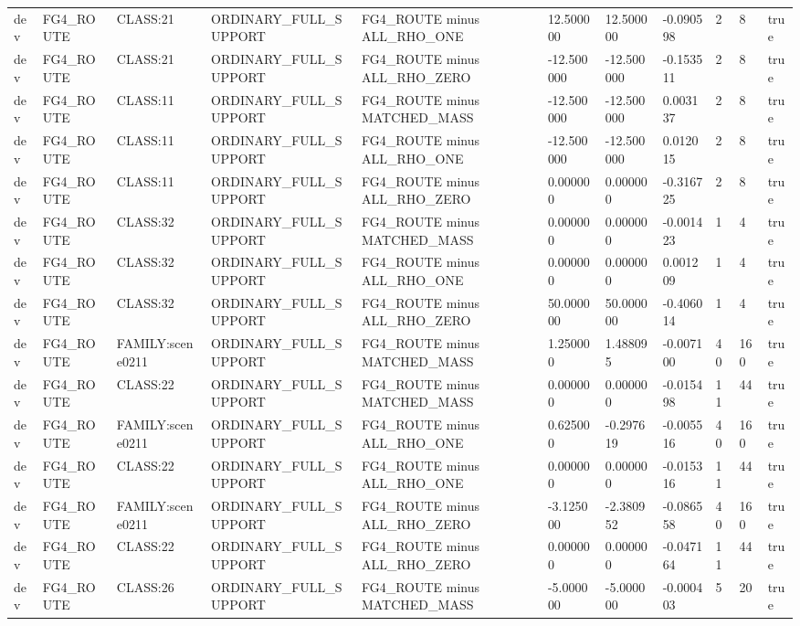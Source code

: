 \begin{tabular}{lllllllllll}
dev & FG4\_ROUTE & CLASS:21 & ORDINARY\_FULL\_SUPPORT & FG4\_ROUTE minus ALL\_RHO\_ONE & 12.500000 & 12.500000 & -0.090598 & 2 & 8 & true \\
dev & FG4\_ROUTE & CLASS:21 & ORDINARY\_FULL\_SUPPORT & FG4\_ROUTE minus ALL\_RHO\_ZERO & -12.500000 & -12.500000 & -0.153511 & 2 & 8 & true \\
dev & FG4\_ROUTE & CLASS:11 & ORDINARY\_FULL\_SUPPORT & FG4\_ROUTE minus MATCHED\_MASS & -12.500000 & -12.500000 & 0.003137 & 2 & 8 & true \\
dev & FG4\_ROUTE & CLASS:11 & ORDINARY\_FULL\_SUPPORT & FG4\_ROUTE minus ALL\_RHO\_ONE & -12.500000 & -12.500000 & 0.012015 & 2 & 8 & true \\
dev & FG4\_ROUTE & CLASS:11 & ORDINARY\_FULL\_SUPPORT & FG4\_ROUTE minus ALL\_RHO\_ZERO & 0.000000 & 0.000000 & -0.316725 & 2 & 8 & true \\
dev & FG4\_ROUTE & CLASS:32 & ORDINARY\_FULL\_SUPPORT & FG4\_ROUTE minus MATCHED\_MASS & 0.000000 & 0.000000 & -0.001423 & 1 & 4 & true \\
dev & FG4\_ROUTE & CLASS:32 & ORDINARY\_FULL\_SUPPORT & FG4\_ROUTE minus ALL\_RHO\_ONE & 0.000000 & 0.000000 & 0.001209 & 1 & 4 & true \\
dev & FG4\_ROUTE & CLASS:32 & ORDINARY\_FULL\_SUPPORT & FG4\_ROUTE minus ALL\_RHO\_ZERO & 50.000000 & 50.000000 & -0.406014 & 1 & 4 & true \\
dev & FG4\_ROUTE & FAMILY:scene0211 & ORDINARY\_FULL\_SUPPORT & FG4\_ROUTE minus MATCHED\_MASS & 1.250000 & 1.488095 & -0.007100 & 40 & 160 & true \\
dev & FG4\_ROUTE & CLASS:22 & ORDINARY\_FULL\_SUPPORT & FG4\_ROUTE minus MATCHED\_MASS & 0.000000 & 0.000000 & -0.015498 & 11 & 44 & true \\
dev & FG4\_ROUTE & FAMILY:scene0211 & ORDINARY\_FULL\_SUPPORT & FG4\_ROUTE minus ALL\_RHO\_ONE & 0.625000 & -0.297619 & -0.005516 & 40 & 160 & true \\
dev & FG4\_ROUTE & CLASS:22 & ORDINARY\_FULL\_SUPPORT & FG4\_ROUTE minus ALL\_RHO\_ONE & 0.000000 & 0.000000 & -0.015316 & 11 & 44 & true \\
dev & FG4\_ROUTE & FAMILY:scene0211 & ORDINARY\_FULL\_SUPPORT & FG4\_ROUTE minus ALL\_RHO\_ZERO & -3.125000 & -2.380952 & -0.086558 & 40 & 160 & true \\
dev & FG4\_ROUTE & CLASS:22 & ORDINARY\_FULL\_SUPPORT & FG4\_ROUTE minus ALL\_RHO\_ZERO & 0.000000 & 0.000000 & -0.047164 & 11 & 44 & true \\
dev & FG4\_ROUTE & CLASS:26 & ORDINARY\_FULL\_SUPPORT & FG4\_ROUTE minus MATCHED\_MASS & -5.000000 & -5.000000 & -0.000403 & 5 & 20 & true \\

\end{tabular}
